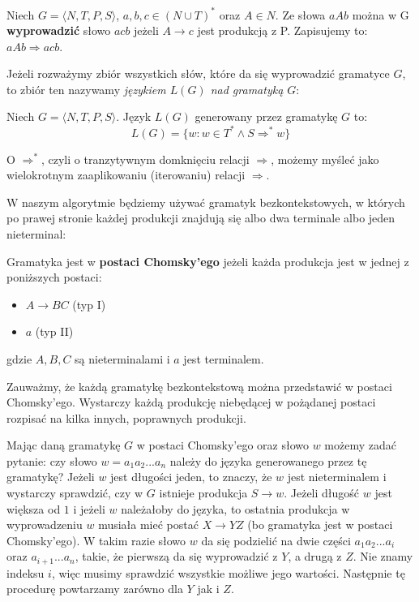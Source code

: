 \begin{definition}
Niech $G = \langle N, T, P, S \rangle$, $a,b,c \in (N \cup T)^*$ oraz $A \in N$.
Ze słowa $aAb$ można w G \textbf{wyprowadzić} słowo $acb$ jeżeli $A \rightarrow c$ jest produkcją z P.
Zapisujemy to: $aAb \Rightarrow acb$.
\end{definition}

Jeżeli rozważymy zbiór wszystkich słów, które da się wyprowadzić gramatyce $G$, to zbiór ten nazywamy \textit{językiem $L(G)$ nad gramatyką $G$}:

\begin{definition}
Niech $G = \langle N, T, P, S \rangle$. Język $L(G)$ generowany przez gramatykę $G$ to:
\[ L(G) = \{w: w\in T^* \land S \Rightarrow^* w \}\]
\end{definition}

O $\Rightarrow^*$, czyli o tranzytywnym domknięciu relacji $\Rightarrow$, możemy myśleć jako wielokrotnym zaaplikowaniu (iterowaniu) relacji $\Rightarrow$.

W naszym algorytmie będziemy używać gramatyk bezkontekstowych, w których po prawej stronie każdej produkcji znajdują się albo dwa terminale albo jeden nieterminal:

\begin{definition}
Gramatyka jest w \textbf{postaci Chomsky'ego} jeżeli każda produkcja jest w jednej z poniższych postaci:
	\begin{itemize}
		\item $A \rightarrow BC$ (typ I)
        \item $a$ (typ II)
	\end{itemize}
gdzie $A,B,C$ są nieterminalami i $a$ jest terminalem.
\end{definition}

Zauważmy, że każdą gramatykę bezkontekstową można przedstawić w postaci Chomsky'ego.
Wystarczy każdą produkcję niebędącej w pożądanej postaci rozpisać na kilka innych, poprawnych produkcji. 

Mając daną gramatykę $G$ w postaci Chomsky'ego oraz słowo $w$ możemy zadać pytanie: czy słowo $w = a_1a_2...a_n$ należy do języka generowanego przez tę gramatykę? 
Jeżeli $w$ jest długości jeden, to znaczy, że $w$ jest nieterminalem i wystarczy sprawdzić, czy w $G$ istnieje produkcja $S \rightarrow w$. 
Jeżeli długość $w$ jest większa od $1$ i jeżeli $w$ należałoby do języka, to ostatnia produkcja w wyprowadzeniu $w$ musiała mieć postać $X \rightarrow YZ$ (bo gramatyka jest w postaci Chomsky'ego).
W takim razie słowo $w$ da się podzielić na dwie części $a_1a_2...a_i$ oraz $a_{i+1}...a_n$, takie, że pierwszą da się wyprowadzić z $Y$, a drugą z $Z$. 
Nie znamy indeksu $i$, więc musimy sprawdzić wszystkie możliwe jego wartości.
Następnie tę procedurę powtarzamy zarówno dla $Y$ jak i $Z$.

